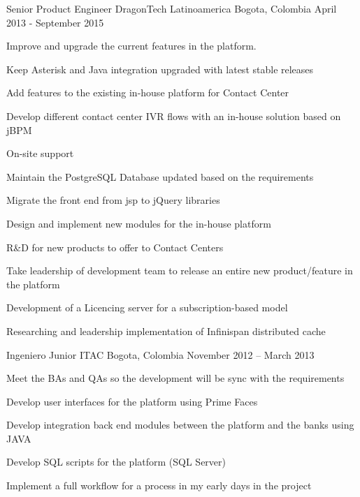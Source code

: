 \begin{cventries}
  \cventry
    {Senior Product Engineer} %
    {DragonTech Latinoamerica} %
    {Bogota, Colombia} %
    {April 2013 - September 2015} %
    {
      \begin{cvitems} %
        \item {Improve and upgrade the current features in the platform.}
        \item {Keep Asterisk and Java integration upgraded with latest stable releases}
        \item {Add features to the existing in-house platform for Contact Center}
        \item {Develop different contact center IVR flows with an in-house solution based on jBPM}
        \item {On-site support}
        \item {Maintain the PostgreSQL Database updated based on the requirements}
        \item {Migrate the front end from jsp to jQuery libraries}
        \item {Design and implement new modules for the in-house platform}
        \item {R&D for new products to offer to Contact Centers}
        \item {Take leadership of development team to release an entire new product/feature in the platform}
        \item {Development of a Licencing server for a subscription-based model}
        \item {Researching and leadership implementation of Infinispan distributed cache}
      \end{cvitems}
    }

  \cventry
    {Ingeniero Junior} %
    {ITAC} %
    {Bogota, Colombia} %
    {November 2012 – March 2013} %
    {
      \begin{cvitems} %
        \item {Meet the BAs and QAs so the development will be sync with the requirements}
        \item {Develop user interfaces for the platform using Prime Faces}
        \item {Develop integration back end modules between the platform and the banks using JAVA}
        \item {Develop SQL scripts for the platform (SQL Server)}
        \item {Implement a full workflow for a process in my early days in the project}
      \end{cvitems}
    }


\end{cventries}
